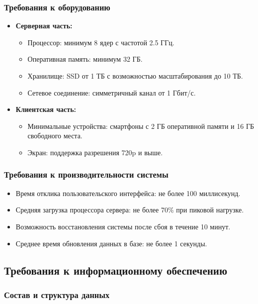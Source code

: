 \subsubsection*{Требования к оборудованию}
\begin{itemize}
	\item \textbf{Серверная часть:}
	\begin{itemize}
		\item Процессор: минимум 8 ядер с частотой 2.5 ГГц.
		\item Оперативная память: минимум 32 ГБ.
		\item Хранилище: SSD от 1 ТБ с возможностью масштабирования до 10 ТБ.
		\item Сетевое соединение: симметричный канал от 1 Гбит/с.
	\end{itemize}
	\item \textbf{Клиентская часть:}
	\begin{itemize}
		\item Минимальные устройства: смартфоны с 2 ГБ оперативной памяти и 16 ГБ свободного места.
		\item Экран: поддержка разрешения 720p и выше.
	\end{itemize}
\end{itemize}

\subsubsection*{Требования к производительности системы}
\begin{itemize}
	\item Время отклика пользовательского интерфейса: не более 100 миллисекунд.
	\item Средняя загрузка процессора сервера: не более 70\% при пиковой нагрузке.
	\item Возможность восстановления системы после сбоя в течение 10 минут.
	\item Среднее время обновления данных в базе: не более 1 секунды.
\end{itemize}


\subsection{Требования к информационному обеспечению}

\subsubsection{Состав и структура данных}


